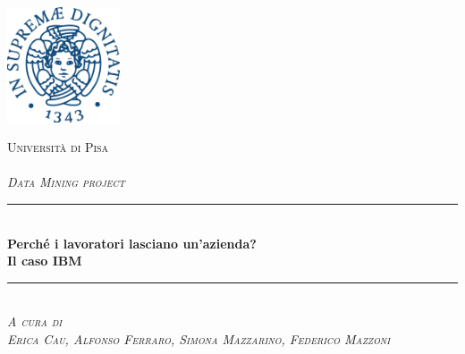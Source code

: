 \documentclass[a4paper, 10.5pt]{article}
\begin{document}
    \begin{titlepage}

        \newcommand{\HRule}{\rule{\linewidth}{0.5mm}}

        \center %
        
        \includegraphics[width = 0.25\textwidth]{prima_pg/unipi.png}\\
        \hspace*{\fill}
        
        \textsc{\LARGE Università di Pisa}\\[1.5cm] %
        \textsc{\Large }\\[0.5cm] 
        \textsc{\LARGE \textit {Data Mining project}}\\[0.8cm]
        \HRule \\[0.8cm]
        { \huge \bfseries Perché i lavoratori lasciano un'azienda?}\\[0.4cm]
        \LARGE\textbf{ Il caso IBM}
        
        \HRule \\[1.5cm]
        \textsc{\Large\textit{{A cura di\\Erica Cau, Alfonso Ferraro, Simona Mazzarino, Federico Mazzoni}}}
  

    \end{titlepage}
    
    
    
    
    
    
    
    
\end{document}
